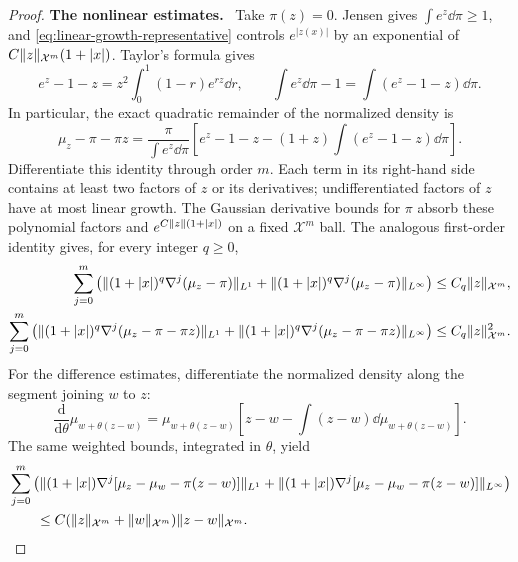 \documentclass[11pt,reqno]{amsart}
\numberwithin{equation}{section}
\theoremstyle{plain}
\theoremstyle{remark}
\DeclarePairedDelimiter{\norm}{\lVert}{\rVert}
\newcommand{\parheading}[1]{\par\medskip\noindent\textbf{#1}\ }
\newcommand{\Xspace}{\mathcal X}
\begin{document}
\begin{proof}
\parheading{The nonlinear estimates.}
Take $\pi(z)=0$. Jensen gives $\int e^z\dd\pi\ge1$, and \eqref{eq:linear-growth-representative} controls $e^{|z(x)|}$ by an exponential of $C\norm z_{\Xspace^m}(1+|x|)$. Taylor's formula gives
\begin{equation}\label{eq:normalized-exponential-remainder}
 e^z-1-z=z^2\int_0^1(1-r)e^{rz}\dd r,
 \qquad
 \int e^z\dd\pi-1=\int(e^z-1-z)\dd\pi.
\end{equation}
In particular, the exact quadratic remainder of the normalized density is
\begin{equation}\label{eq:normalized-density-remainder-formula}
 \mu_z-\pi-\pi z
 =\frac{\pi}{\int e^z\dd\pi}
   \left[e^z-1-z-(1+z)\int(e^z-1-z)\dd\pi\right].
\end{equation}
Differentiate this identity through order $m$. Each term in its right-hand side contains at least two factors of $z$ or its derivatives; undifferentiated factors of $z$ have at most linear growth. The Gaussian derivative bounds for $\pi$ absorb these polynomial factors and $e^{C\norm z(1+|x|)}$ on a fixed $\Xspace^m$ ball. The analogous first-order identity gives, for every integer $q\ge0$,
\begin{align}
 \sum_{j=0}^m\left(\norm{(1+|x|)^q\nabla^j(\mu_z-\pi)}_{L^1}
       +\norm{(1+|x|)^q\nabla^j(\mu_z-\pi)}_{L^\infty}\right)
       &\le C_q\norm z_{\Xspace^m},\label{eq:normalized-first-remainder}\\
 \sum_{j=0}^m\left(\norm{(1+|x|)^q\nabla^j(\mu_z-\pi-\pi z)}_{L^1}
       +\norm{(1+|x|)^q\nabla^j(\mu_z-\pi-\pi z)}_{L^\infty}\right)
       &\le C_q\norm z_{\Xspace^m}^2.\label{eq:normalized-second-remainder}
\end{align}
For the difference estimates, differentiate the normalized density along the segment joining $w$ to $z$:
\begin{equation}\label{eq:normalized-density-directional-derivative}
 \frac{\mathrm d}{\mathrm d\theta}\mu_{w+\theta(z-w)}
 =\mu_{w+\theta(z-w)}
   \left[z-w-\int(z-w)\dd\mu_{w+\theta(z-w)}\right].
\end{equation}
The same weighted bounds, integrated in $\theta$, yield
\begin{align}
 &\sum_{j=0}^m\left(
 \norm{(1+|x|)\nabla^j[\mu_z-\mu_w-\pi(z-w)]}_{L^1}
 +\norm{(1+|x|)\nabla^j[\mu_z-\mu_w-\pi(z-w)]}_{L^\infty}\right)\notag\\
 &\hspace{2em}\le C(\norm z_{\Xspace^m}+\norm w_{\Xspace^m})
                      \norm{z-w}_{\Xspace^m}.
 \label{eq:normalized-remainder-Lipschitz}

\end{align}
\end{proof}
\end{document}
